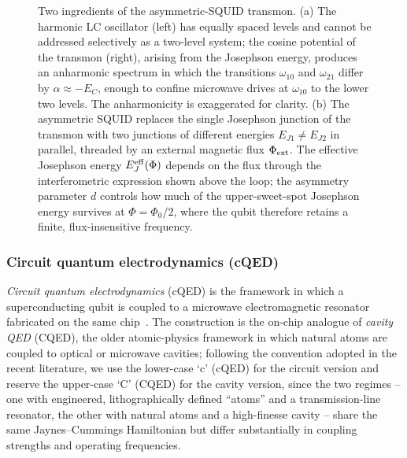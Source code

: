 \begin{figure}[htbp]
{
  }
  \caption{Two ingredients of the asymmetric-SQUID transmon. (a) The
    harmonic LC oscillator (left) has equally spaced levels and cannot
    be addressed selectively as a two-level system; the cosine potential
    of the transmon (right), arising from the Josephson energy, produces
    an anharmonic spectrum in which the transitions $\omega_{10}$ and
    $\omega_{21}$ differ by $\alpha \approx -E_C$, enough to confine
    microwave drives at $\omega_{10}$ to the lower two levels. The
    anharmonicity is exaggerated for clarity. (b) The asymmetric SQUID
    replaces the single Josephson junction of the transmon with two
    junctions of different energies $E_{J1} \neq E_{J2}$ in parallel,
    threaded by an external magnetic flux $\Phi_{\rm ext}$. The
    effective Josephson energy $E_J^{\rm eff}(\Phi)$ depends on the
    flux through the interferometric expression shown above the loop;
    the asymmetry parameter $d$ controls how much of the upper-sweet-spot
    Josephson energy survives at $\Phi = \Phi_0/2$, where the qubit
    therefore retains a finite, flux-insensitive frequency.}
  \label{fig:hw_preliminaries_didactic}
\end{figure}

\subsubsection*{Circuit quantum electrodynamics (cQED)}

\emph{Circuit quantum electrodynamics} (cQED) is the framework in which a superconducting qubit is coupled to a microwave electromagnetic resonator fabricated on the same chip~\cite{blais2021circuit}. The construction is the on-chip analogue of \emph{cavity QED} (CQED), the older atomic-physics framework in which natural atoms are coupled to optical or microwave cavities; following the convention adopted in the recent literature, we use the lower-case `c' (cQED) for the circuit version and reserve the upper-case `C' (CQED) for the cavity version, since the two regimes -- one with engineered, lithographically defined ``atoms'' and a transmission-line resonator, the other with natural atoms and a high-finesse cavity -- share the same Jaynes--Cummings Hamiltonian but differ substantially in coupling strengths and operating frequencies.

